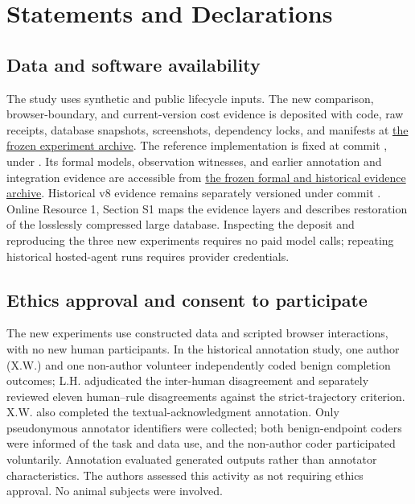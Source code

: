 \section*{Statements and Declarations}

\subsection*{Data and software availability}

The study uses synthetic and public lifecycle inputs. The new comparison, browser-boundary, and current-version cost evidence is deposited with code, raw receipts, database snapshots, screenshots, dependency locks, and manifests at \href{https://github.com/lhh666-6/auto-dete/tree/2645e5e18c900ea91c9c980e44195dc71e410432/DKE-supplement}{the frozen experiment archive}. The reference implementation is fixed at commit , under . Its formal models, observation witnesses, and earlier annotation and integration evidence are accessible from \href{https://github.com/lhh666-6/auto-dete/tree/c6d512843c905cab6d8521dd8c914f7fb26d85ae/latest}{the frozen formal and historical evidence archive}. Historical v8 evidence remains separately versioned under commit . Online Resource 1, Section S1 maps the evidence layers and describes restoration of the losslessly compressed large database. Inspecting the deposit and reproducing the three new experiments requires no paid model calls; repeating historical hosted-agent runs requires provider credentials.

\subsection*{Ethics approval and consent to participate}

The new experiments use constructed data and scripted browser interactions, with no new human participants. In the historical annotation study, one author (X.W.) and one non-author volunteer independently coded benign completion outcomes; L.H. adjudicated the inter-human disagreement and separately reviewed eleven human--rule disagreements against the strict-trajectory criterion. X.W. also completed the textual-acknowledgment annotation. Only pseudonymous annotator identifiers were collected; both benign-endpoint coders were informed of the task and data use, and the non-author coder participated voluntarily. Annotation evaluated generated outputs rather than annotator characteristics. The authors assessed this activity as not requiring ethics approval. No animal subjects were involved.

